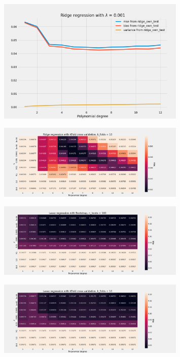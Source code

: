 \begin{figure}[H]
    \centering
    \includegraphics[width=0.8\textwidth]{Figures/e_ridge_bias_variance_lamb_0_001.png}
\end{figure}


\begin{figure}[H]
    \centering
    \includegraphics[width=0.8\textwidth]{Figures/e_ridge_kfold_n_10.png}
\end{figure}



\begin{figure}[H]
    \centering
    \includegraphics[width=0.8\textwidth]{Figures/f_lasso_bootstrap_n_100.png}
\end{figure}

\begin{figure}[H]
    \centering
    \includegraphics[width=0.8\textwidth]{Figures/f_lasso_kfold_n_10.png}
\end{figure}



